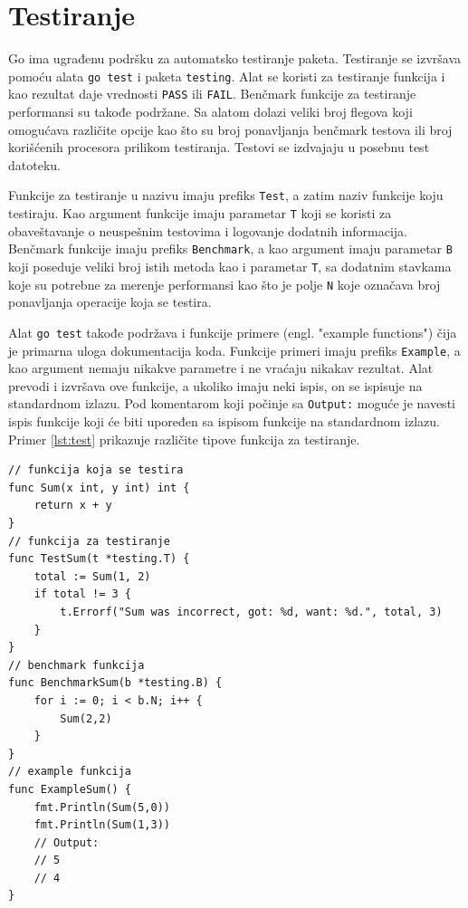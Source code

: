 \documentclass[12pt,oneside]{memoir}
\begin{document}
\section{Testiranje}

Go ima ugrađenu podršku za automatsko testiranje paketa. Testiranje se izvršava pomoću alata \texttt{go test} i paketa \texttt{testing}. Alat se koristi za testiranje funkcija i kao rezultat daje vrednosti \texttt{PASS} ili \texttt{FAIL}. Benčmark funkcije za testiranje performansi su takođe podržane. Sa alatom dolazi veliki broj flegova koji omogućava različite opcije kao što su broj ponavljanja benčmark testova ili broj korišćenih procesora prilikom testiranja. Testovi se izdvajaju u posebnu test datoteku. 

Funkcije za testiranje u nazivu imaju prefiks \texttt{Test}, a zatim naziv funkcije koju testiraju. Kao argument funkcije imaju parametar \texttt{T} koji se koristi za obaveštavanje o neuspešnim testovima i logovanje dodatnih informacija. Benčmark funkcije imaju prefiks \texttt{Benchmark}, a kao argument imaju parametar \texttt{B} koji poseduje veliki broj istih metoda kao i parametar \texttt{T}, sa dodatnim stavkama koje su potrebne za merenje performansi kao što je polje \texttt{N} koje označava broj ponavljanja operacije koja se testira.

Alat \texttt{go test} takođe podržava i funkcije primere (engl. "example functions") čija je primarna uloga dokumentacija koda. Funkcije primeri imaju prefiks  \texttt{Example}, a kao argument nemaju nikakve parametre i ne vraćaju nikakav rezultat. Alat prevodi i izvršava ove funkcije, a ukoliko imaju neki ispis, on se ispisuje na standardnom izlazu. Pod komentarom koji počinje sa \texttt{Output:} moguće je navesti ispis funkcije koji će biti upoređen sa ispisom funkcije na standardnom izlazu. Primer \ref{lst:test} prikazuje različite tipove funkcija za testiranje.

\begin{center}
\begin{lstlisting}[caption=Različiti tipovi funkcija za testiranje, label={lst:test},  backgroundcolor=\color{background}]
// funkcija koja se testira
func Sum(x int, y int) int {  
	return x + y
}
// funkcija za testiranje
func TestSum(t *testing.T) {  
	total := Sum(1, 2)
	if total != 3 {
		t.Errorf("Sum was incorrect, got: %d, want: %d.", total, 3)
	}
}
// benchmark funkcija
func BenchmarkSum(b *testing.B) {
	for i := 0; i < b.N; i++ {
		Sum(2,2)
	}
}
// example funkcija
func ExampleSum() {
	fmt.Println(Sum(5,0))
	fmt.Println(Sum(1,3))
	// Output:
	// 5
	// 4
}

\end{lstlisting}
\end{center}
\end{document}
